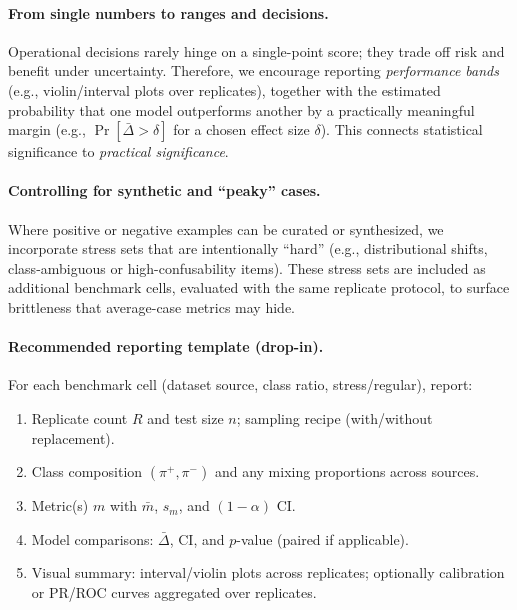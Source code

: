 \documentclass[11pt]{article}
\begin{document}
\paragraph{From single numbers to ranges and decisions.}
Operational decisions rarely hinge on a single-point score; they trade off risk and benefit under uncertainty.
Therefore, we encourage reporting \emph{performance bands} (e.g., violin/interval plots over replicates), together with the estimated probability that one model outperforms another by a practically meaningful margin (e.g., $\Pr[\bar{\Delta}>\delta]$ for a chosen effect size $\delta$).
This connects statistical significance to \emph{practical significance}.

\paragraph{Controlling for synthetic and ``peaky'' cases.}
Where positive or negative examples can be curated or synthesized, we incorporate stress sets that are intentionally ``hard'' (e.g., distributional shifts, class-ambiguous or high-confusability items).
These stress sets are included as additional benchmark cells, evaluated with the same replicate protocol, to surface brittleness that average-case metrics may hide.

\paragraph{Recommended reporting template (drop-in).}
For each benchmark cell (dataset source, class ratio, stress/regular), report:
\begin{enumerate}
  \item Replicate count $R$ and test size $n$; sampling recipe (with/without replacement).
  \item Class composition $(\pi^{+},\pi^{-})$ and any mixing proportions across sources.
  \item Metric(s) $m$ with $\bar{m}$, $s_m$, and $(1-\alpha)$ CI.
  \item Model comparisons: $\bar{\Delta}$, CI, and $p$-value (paired if applicable).
  \item Visual summary: interval/violin plots across replicates; optionally calibration or PR/ROC curves aggregated over replicates.
\end{enumerate}
\end{document}
